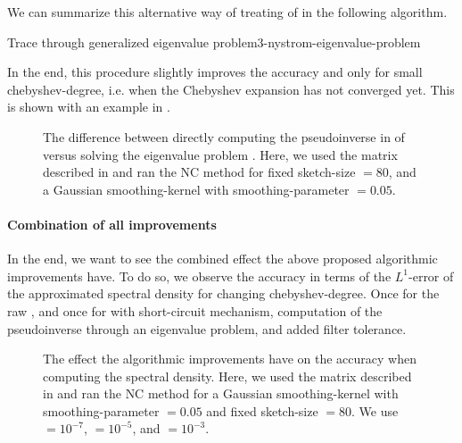 We can summarize this alternative way of treating
 of 
in the following algorithm.
\begin{algo}{Trace through generalized eigenvalue problem}{3-nystrom-eigenvalue-problem}
    
\end{algo}

In the end, this procedure slightly improves the accuracy
and only for small \gls{chebyshev-degree}, i.e. when the Chebyshev expansion has
not converged yet. This is shown with an example in .\\

\begin{figure}[ht]
    \centering
    
    \caption{The difference between directly computing the pseudoinverse
        in  of 
        versus solving the eigenvalue problem .
        Here, we used the matrix described in 
        and ran the \gls{NC} method for fixed \gls{sketch-size} $=80$, and a
        Gaussian \gls{smoothing-kernel} with \gls{smoothing-parameter} $=0.05$.}
    \label{fig:3-nystrom-eigenvalue-problem}
\end{figure}

\paragraph{Combination of all improvements}

In the end, we want to see the combined effect the above proposed algorithmic
improvements have. To do so, we observe the accuracy in terms of the $L^1$-error
of the approximated spectral density for changing \gls{chebyshev-degree}. Once
for the raw , and once for 
with short-circuit mechanism, computation of the pseudoinverse through
an eigenvalue problem, and added filter tolerance.

\begin{figure}[ht]
    \centering
    
    \caption{The effect the algorithmic improvements have on the accuracy when
        computing the spectral density.
        Here, we used the matrix described in 
        and ran the \gls{NC} method for a Gaussian \gls{smoothing-kernel} with \gls{smoothing-parameter} $=0.05$
        and fixed \gls{sketch-size} $=80$. We use
         $=10^{-7}$,
         $=10^{-5}$, and
         $=10^{-3}$.}
    \label{fig:3-nystrom-improved-algorithm}
\end{figure}

